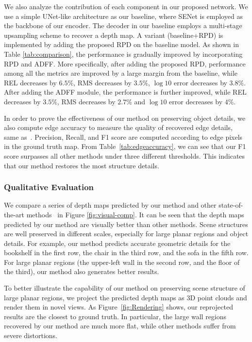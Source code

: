 \documentclass{article}
\begin{document}
We also analyze the contribution of each component in our proposed network. 
We use a simple UNet-like architecture as our baseline, where SENet \cite{hu2018squeeze} is employed as the backbone of our encoder. 
The decoder in our baseline employs a multi-stage upsampling scheme to recover a depth map. 
A variant (baseline+RPD) is implemented by adding the proposed RPD on the baseline model.
As shown in Table \ref{tab:comparison}, the performance is gradually improved by incorporating RPD and ADFF. More specifically, after adding the proposed RPD, performance among all the metrics are improved by a large margin from the baseline, while REL decreases by $6.5\%$, RMS decreases by $3.5\%$, $\log 10$ error decreases by $3.8\%$. 
After adding the ADFF module, the performance is further improved, while REL decreases by $3.5\%$, RMS decreases by $2.7\%$ and $\log 10$ error decreases by $4\%$.  

In order to prove the effectiveness of our method on preserving object details, we also compute edge accuracy to measure the quality of recovered edge details, same as~\cite{hu2019revisiting}. Precision, Recall, and F1 score are computed according to edge pixels in the ground truth map. From Table~\ref{tab:edgeaccuracy}, we can see that our F1 score surpasses all other methods under three different thresholds. This indicates that our method restores the most structure details.
\subsubsection{Qualitative Evaluation}
We compare a series of depth maps predicted by our method and other state-of-the-art methods~\cite{laina2016deeper,xu2017multi,fu2018deep,hu2019revisiting} in Figure \ref{fig:visual-comp}.
It can be seen that the depth maps predicted by our method are visually better than other methods.
Scene structures are well preserved in different scales, especially for large planar regions and object details.
For example, our method predicts accurate geometric details for the bookshelf in the first row, the chair in the third row, and the sofa in the fifth row. 
For large planar regions (the upper-left wall in the second row, and the floor of the third), our method also generates better results. 

To better illustrate the capability of our method on preserving scene structure of large planar regions, we project the predicted depth maps as 3D point clouds and render them in novel views.
As Figure~\ref{fig:Rendering} shows, our reprojected results are the closest to ground truth. In particular, the large wall regions recovered by our method are much more flat, while other methods suffer from severe distortions. 
\end{document}
